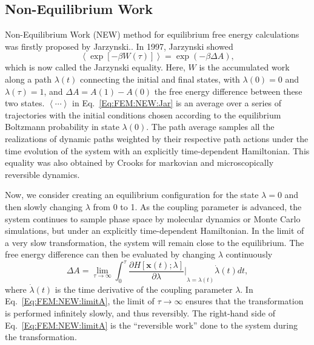 \subsection{Non-Equilibrium Work\label{Sec:FEM:NEW}}
Non-Equilibrium Work (NEW) method for equilibrium free energy calculations was firstly proposed by Jarzynski.\cite{JarzynskiPRL1997}. 
In 1997, Jarzynski showed
\begin{equation}
\left< \exp\left[-\beta W(\tau)\right] \right> = \exp{(-\beta \Delta A)},
\label{Eq:FEM:NEW:Jar}
\end{equation}
which is now called the Jarzynski equality. Here, $W$ is the accumulated work along a path $\lambda(t)$ connecting the initial and final states, with $\lambda(0)=0$ and $\lambda(\tau)=1$, and $\Delta A = A(1) - A(0)$ the free energy difference between these two states. 
$\left \langle \cdots \right \rangle$ in Eq.~\ref{Eq:FEM:NEW:Jar} is an average over a series of trajectories with the initial conditions chosen according to the equilibrium Boltzmann probability in state $\lambda(0)$. The path average samples all the realizations of dynamic paths weighted by their respective path actions under the time evolution of the system with an explicitly time-dependent Hamiltonian. This equality was also obtained by Crooks for markovian and microscopically reversible dynamics.\cite{CrooksJSP1998} 

Now, we consider creating an equilibrium configuration for the state $\lambda=0$ and then slowly changing $\lambda$ from 0 to 1. As the coupling parameter is advanced, the system continues to sample phase space by molecular dynamics or Monte Carlo simulations, but under an explicitly time-dependent Hamiltonian. In the limit of a very slow transformation, the system will remain close to the equilibrium. The free energy difference can then be evaluated by changing $\lambda$ continuously
\begin{equation}
\Delta A =\lim_{\tau\to\infty} \int_{0}^{\tau} {\frac{\partial{H\left[\textbf{x}(t);\lambda\right]}}{\partial{\lambda}}\bigg\rvert}_{\lambda=\lambda(t)} \dot{\lambda}(t) dt,
\label{Eq:FEM:NEW:limitA}
\end{equation}  
where $\dot{\lambda}(t)$ is the time derivative of the coupling parameter $\lambda$. In Eq.~\ref{Eq:FEM:NEW:limitA}, the limit of $\tau\to\infty$ ensures that the transformation is performed infinitely slowly, and thus reversibly. The right-hand side of Eq.~\ref{Eq:FEM:NEW:limitA} is the ``reversible work'' done to the system during the transformation.

